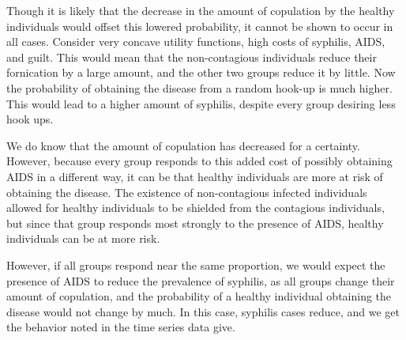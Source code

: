 \documentclass[12pt]{paper}
\begin{document}
Though it is likely that the decrease in the amount of copulation by
the healthy individuals would offset this lowered probability, it
cannot be shown to occur in all cases. Consider very concave utility
functions, high costs of syphilis, AIDS, and guilt. This would mean
that the non-contagious individuals reduce their fornication by a
large amount, and the other two groups reduce it by little. Now the
probability of obtaining the disease from a random hook-up is much
higher. This would lead to a higher amount of syphilis, despite every
group desiring less hook ups. 

We do know that the amount of copulation has decreased for a
certainty. However, because every group responds to this added cost of
possibly obtaining AIDS in a different way, it can be that healthy
individuals are more at risk of obtaining the disease. The existence
of non-contagious infected individuals allowed for healthy individuals
to be shielded from the contagious individuals, but since that group
responds most strongly to the presence of AIDS, healthy individuals
can be at more risk.

However, if all groups respond near the same proportion, we would
expect the presence of AIDS to reduce the prevalence of syphilis, as
all groups change their amount of copulation, and the probability of a
healthy individual obtaining the disease would not change by much. In
this case, syphilis cases reduce, and we get the behavior noted in the
time series data give.
\end{document}
